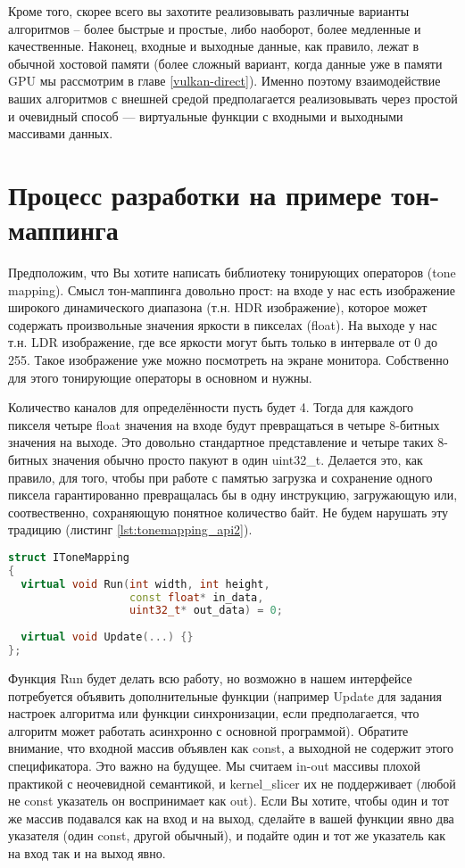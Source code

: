 \documentclass[11pt,fleqn,english,russian]{report} %
\begin{document}
Кроме того, скорее всего вы захотите реализовывать различные варианты алгоритмов -- более быстрые и простые, либо наоборот, более медленные и качественные. Наконец, входные и выходные данные, как правило, лежат в обычной хостовой памяти (более сложный вариант, когда данные уже в памяти GPU мы рассмотрим в главе \ref{vulkan-direct}). Именно поэтому взаимодействие ваших алгоритмов с внешней средой предполагается реализовывать через простой и очевидный способ --- виртуальные функции с входными и выходными массивами данных. 

\section{Процесс разработки на примере тон-маппинга}\label{tm_example}

Предположим, что Вы хотите написать библиотеку тонирующих операторов (tone mapping). Смысл тон-маппинга довольно прост: на входе у нас есть изображение широкого динамического диапазона (т.н. HDR изображение), которое может содержать произвольные значения яркости в пикселах (float). На выходе у нас т.н. LDR изображение, где все яркости могут быть только в интервале от 0 до 255. Такое изображение уже можно посмотреть на экране монитора. Собственно для этого тонирующие операторы в основном и нужны.

Количество каналов для определённости пусть будет 4. Тогда для каждого пикселя четыре float значения на входе будут превращаться в четыре 8-битных значения на выходе. Это довольно стандартное представление и четыре таких 8-битных значения обычно просто пакуют в один uint32\_t. Делается это, как правило, для того, чтобы при работе с памятью загрузка и сохранение одного пиксела гарантированно превращалась бы в одну инструкцию, загружающую или, соотвественно, сохраняющую понятное количество байт. Не будем нарушать эту традицию (листинг \ref{lst:tonemapping_api2}).

\begin{lstlisting}[language=C++, caption=интерфейс алгоритмов тон-маппинга]
struct IToneMapping
{
  virtual void Run(int width, int height, 
                   const float* in_data,
                   uint32_t* out_data) = 0;
                   
  virtual void Update(...) {}                 
};
\end{lstlisting}\label{lst:tonemapping_api2}

Функция Run будет делать всю работу, но возможно в нашем интерфейсе потребуется объявить дополнительные функции (например Update для задания настроек алгоритма или функции синхронизации, если предполагается, что алгоритм может работать асинхронно с основной программой). Обратите внимание, что входной массив объявлен как const, а выходной не содержит этого спецификатора. Это важно на будущее. Мы считаем in-out массивы плохой практикой с неочевидной семантикой, и kernel\_slicer их не поддерживает (любой не const указатель он воспринимает как out). Если Вы хотите, чтобы один и тот же массив подавался как на вход и на выход, сделайте в вашей функции явно два указателя (один const, другой обычный), и подайте один и тот же указатель как на вход так и на выход явно.  
\end{document}
